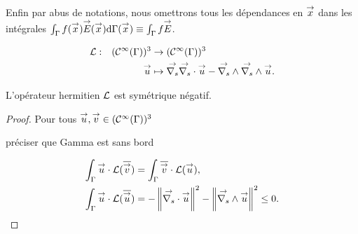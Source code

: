   Enfin par abus de notations, nous omettrons tous les dépendances en \(\vx\) dans les intégrales \(\int_\Gamma f(\vx)\vE(\vx)\dd{\Gamma(\vx)}\equiv \int_\Gamma f\vE\).
  \begin{defn}
    \label{def:operator:L}
    \begin{equation*}
        \fonction{\LL}{(\mathcal{C}^\infty(\Gamma))^3}{(\mathcal{C}^\infty(\Gamma))^3}
          {\vu}{\vgrads{\vdivs \vu} - \vrots{\vrots \vu}.}
    \end{equation*}
  \end{defn}

  \begin{prop}
    \label{eq:hodge:negatif}
    L’opérateur hermitien \(\LL\) est symétrique négatif.
  \end{prop}

  \begin{proof}
    Pour tous \(\vu,\vv \in (\mathcal C^\infty(\Gamma))^3\)
    \begin{REM}
  préciser que Gamma est sans bord
\end{REM}
    \begin{align*}
      \int_\Gamma \vu\cdot \LL(\conj{\vv}) &= \int_\Gamma \conj{\vv}\cdot \LL(\vu),
      \\
      \int_\Gamma \vu\cdot \LL(\conj{\vu}) &= -\norm{\vdivs{\vu}}^2 - \norm{\vrots\vu}^2 \le 0.
    \end{align*}
  \end{proof}


